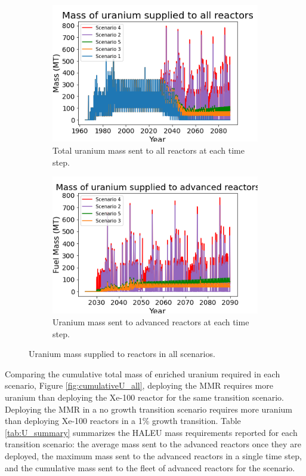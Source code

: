 \begin{figure}
    \centering
    \begin{subfigure}{0.45\textwidth}
        \centering
        \includegraphics[scale=0.4]{../figures/fuelsupply_scenarios_all.png}
        \caption{Total uranium mass sent to all reactors at each time step.}
        \label{fig:totalfuel_all}
    \end{subfigure}
    \hspace{0.8cm}
    \begin{subfigure}{0.45\textwidth}
        \centering
        \includegraphics[scale=0.4]{../figures/advancedRX_fuelsupply_scenarios_2-5.png}
        \caption{Uranium mass sent to advanced reactors at each time step.}
        \label{fig:haleufuel_all}
    \end{subfigure}
    \caption{Uranium mass supplied to reactors in all scenarios.}
    \label{fig:fuel_all}
\end{figure}

Comparing the cumulative total mass of enriched uranium required in each scenario, 
Figure \ref{fig:cumulativeU_all}, deploying the \gls{MMR} 
requires more uranium than deploying the Xe-100 reactor for the same 
transition scenario. Deploying the \gls{MMR} in a no growth transition 
scenario requires more uranium than deploying Xe-100 reactors in a 1\% 
growth transition. Table \ref{tab:U_summary} summarizes the \gls{HALEU} mass 
requirements reported for each transition scenario: the average mass sent to 
the advanced reactors once they are deployed, the maximum mass sent to the 
advanced reactors in a single time step, and the cumulative mass sent to the 
fleet of advanced reactors for the scenario. 

